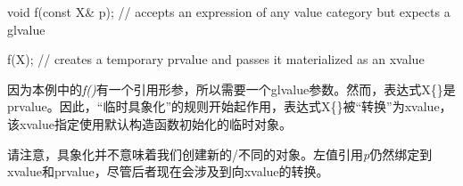 \begin{cppcode}
void f(const X& p); // accepts an expression of any value category but expects a glvalue

f(X{}); // creates a temporary prvalue and passes it materialized as an xvalue
\end{cppcode}

因为本例中的\textit{f()}有一个引用形参，所以需要一个glvalue参数。然而，表达式X\{\}是prvalue。因此，“临时具象化”的规则开始起作用，表达式X\{\}被“转换”为xvalue，该xvalue指定使用默认构造函数初始化的临时对象。

请注意，具象化并不意味着我们创建新的/不同的对象。左值引用\textit{p}仍然绑定到xvalue和prvalue，尽管后者现在会涉及到向xvalue的转换。






